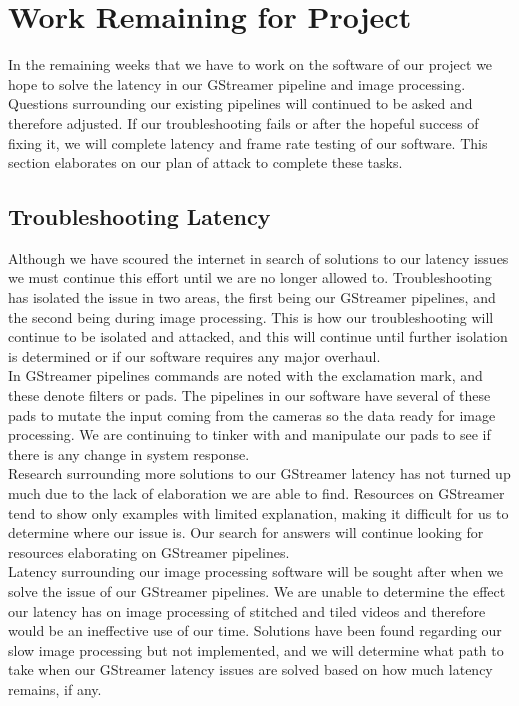 \documentclass[letterpaper,10pt,serif,draftclsnofoot,onecolumn,compsoc,titlepage]{IEEEtran}
\begin{document}
\section{Work Remaining for Project}

In the remaining weeks that we have to work on the software of our project we hope to 
solve the latency in our GStreamer pipeline and image processing. Questions surrounding 
our existing pipelines will continued to be asked and therefore adjusted. If our 
troubleshooting fails or after the hopeful success of fixing it, we will complete latency 
and frame rate testing of our software. This section elaborates on our plan of attack to 
complete these tasks.\\

\subsection{Troubleshooting Latency}

Although we have scoured the internet in search of solutions to our latency issues we must 
continue this effort until we are no longer allowed to. Troubleshooting has isolated the 
issue in two areas, the first being our GStreamer pipelines, and the second being during 
image processing. This is how our troubleshooting will continue to be isolated and attacked, 
and this will continue until further isolation is determined or if our software requires 
any major overhaul. \\

In GStreamer pipelines commands are noted with the exclamation mark, and these denote 
filters or pads. The pipelines in our software have several of these pads to mutate 
the input coming from the cameras so the data ready for image processing. We are continuing 
to tinker with and manipulate our pads to see if there is any change in system response. \\

Research surrounding more solutions to our GStreamer latency has not turned up much 
due to the lack of elaboration we are able to find. Resources on GStreamer tend to show 
only examples with limited explanation, making it difficult for us to determine where 
our issue is. Our search for answers will continue looking for resources elaborating on 
GStreamer pipelines. \\

Latency surrounding our image processing software will be sought after when we solve the 
issue of our GStreamer pipelines. We are unable to determine the effect our latency has 
on image processing of stitched and tiled videos and therefore would be an ineffective 
use of our time. Solutions have been found regarding our slow image processing but not 
implemented, and we will determine what path to take when our GStreamer latency issues 
are solved based on how much latency remains, if any. \\
\end{document}
